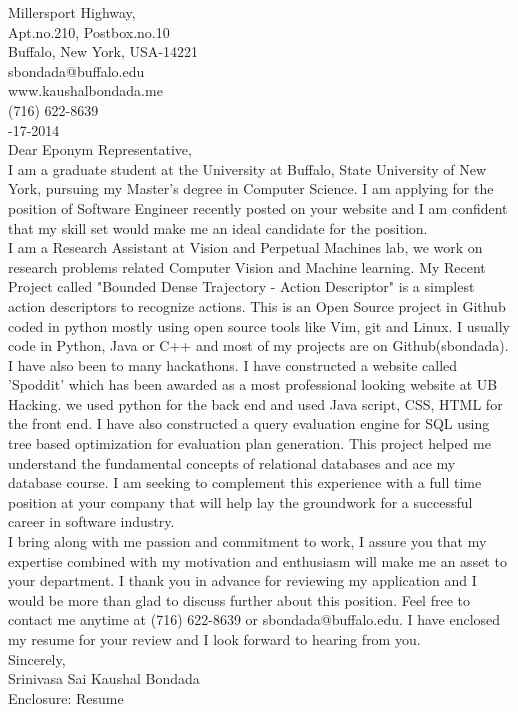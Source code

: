 \documentclass[10pt,letterpaper,oneside]{article}
\begin{document}
 Millersport Highway,\\
Apt.no.210, Postbox.no.10\\
Buffalo, New York, USA-14221\\
sbondada@buffalo.edu\\
www.kaushalbondada.me\\
(716) 622-8639\\

-17-2014\\
 
\noindent Dear Eponym Representative,\\
 
I am a graduate student at the University at Buffalo, State University of New York, pursuing my Master's degree in Computer Science. I am
applying for the position of Software Engineer recently posted on your website and I am confident that my skill set would make me an ideal candidate for the position.\\

I am a Research Assistant at Vision and Perpetual Machines lab, we work on research problems related Computer Vision and Machine learning. My
Recent Project called "Bounded Dense Trajectory - Action Descriptor" is a simplest action descriptors to recognize actions. This is an Open Source 
project in Github coded in python mostly using open source tools like Vim, git and Linux. I usually code in Python, Java or C++ and
most of my projects are on Github(sbondada). I have also been to many hackathons. I have constructed a website called 'Spoddit' which has
been awarded as a most professional looking website at UB Hacking. we used python for the back end and used Java script, CSS, HTML for the
front end. I have also constructed a query evaluation engine for SQL using tree based optimization for evaluation plan generation. This project helped me understand the fundamental concepts
of relational databases and ace my database course. I am seeking to complement this experience with a full time position at your company that will help lay the groundwork for a successful career in software industry.\\

 
I bring along with me passion and commitment to work, I assure you that my expertise combined with my motivation and enthusiasm will make me
an asset to your department. I thank you in advance for reviewing my application and I would be more than glad to discuss further about this position. Feel free to contact me anytime at (716) 622-8639 or sbondada@buffalo.edu. I have enclosed my resume for your review and I look forward to hearing from you.\\
 
\noindent Sincerely,\\
Srinivasa Sai Kaushal Bondada\\
Enclosure: Resume\\
\end{document}
